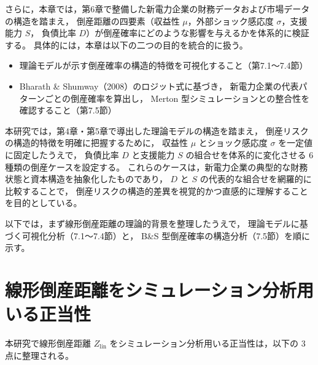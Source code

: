 さらに，本章では，第6章で整備した新電力企業の財務データおよび市場データの構造を踏まえ，
倒産距離の四要素（収益性 $\mu$，外部ショック感応度 $\sigma$，支援能力 $S$，
負債比率 $D$）が倒産確率にどのような影響を与えるかを体系的に検証する。
具体的には，本章は以下の二つの目的を統合的に扱う。

\begin{itemize}
    \item 理論モデルが示す倒産確率の構造的特徴を可視化すること（第7.1〜7.4節）
    \item Bharath \& Shumway（2008）のロジット式に基づき，
          新電力企業の代表パターンごとの倒産確率を算出し，
          Merton 型シミュレーションとの整合性を確認すること（第7.5節）
\end{itemize}

本研究では，第4章・第5章で導出した理論モデルの構造を踏まえ，
倒産リスクの構造的特徴を明確に把握するために，
収益性 $\mu$ とショック感応度 $\sigma$ を一定値に固定したうえで，
負債比率 $D$ と支援能力 $S$ の組合せを体系的に変化させる
6 種類の倒産ケースを設定する。
これらのケースは，新電力企業の典型的な財務状態と資本構造を抽象化したものであり，
$D$ と $S$ の代表的な組合せを網羅的に比較することで，
倒産リスクの構造的差異を視覚的かつ直感的に理解することを目的としている。

以下では，まず線形倒産距離の理論的背景を整理したうえで，
理論モデルに基づく可視化分析（7.1〜7.4節）と，
B\&S 型倒産確率の構造分析（7.5節）を順に示す。



\section{線形倒産距離をシミュレーション分析用いる正当性}

本研究で線形倒産距離 $Z_{\text{lin}}$ をシミュレーション分析用いる正当性は，以下の 3 点に整理される。

